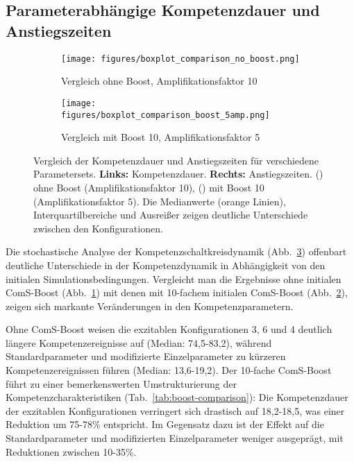\documentclass[11pt]{article}
\begin{document}
\subsection{Parameterabhängige Kompetenzdauer und Anstiegszeiten}

\begin{figure}
    \centering
    \begin{subfigure}{\textwidth}
        \centering
        \texttt{[image: figures/boxplot\_comparison\_no\_boost.png]}
        \caption{Vergleich ohne Boost, Amplifikationsfaktor 10}
        \label{fig:boxplot_no_boost}
    \end{subfigure}
    
    \vspace{0.3cm} %
    
    \begin{subfigure}{\textwidth}
        \centering
        \texttt{[image: figures/boxplot\_comparison\_boost\_5amp.png]}
        \caption{Vergleich mit Boost 10, Amplifikationsfaktor 5}
        \label{fig:boxplot_with_boost}
    \end{subfigure}
    
    \caption{Vergleich der Kompetenzdauer und Anstiegszeiten für verschiedene Parametersets. \textbf{Links:} Kompetenzdauer. \textbf{Rechts:} Anstiegszeiten. () ohne Boost (Amplifikationsfaktor 10), () mit Boost 10 (Amplifikationsfaktor 5). Die Medianwerte (orange Linien), Interquartilbereiche und Ausreißer zeigen deutliche Unterschiede zwischen den Konfigurationen.}
    \label{fig:boxplot_comparison}
\end{figure}

Die stochastische Analyse der Kompetenzschaltkreisdynamik (Abb.~\ref{fig:boxplot_comparison}) offenbart deutliche Unterschiede in der Kompetenzdynamik in Abhängigkeit von den initialen Simulationsbedingungen. Vergleicht man die Ergebnisse ohne initialen ComS-Boost (Abb.~\ref{fig:boxplot_no_boost}) mit denen mit 10-fachem initialen ComS-Boost (Abb.~\ref{fig:boxplot_with_boost}), zeigen sich markante Veränderungen in den Kompetenzparametern.

Ohne ComS-Boost weisen die exzitablen Konfigurationen 3, 6 und 4 deutlich längere Kompetenzereignisse auf (Median: 74,5-83,2), während Standardparameter und modifizierte Einzelparameter zu kürzeren Kompetenzereignissen führen (Median: 13,6-19,2). Der 10-fache ComS-Boost führt zu einer bemerkenswerten Umstrukturierung der Kompetenzcharakteristiken (Tab.~\ref{tab:boost-comparison}): Die Kompetenzdauer der exzitablen Konfigurationen verringert sich drastisch auf 18,2-18,5, was einer Reduktion um 75-78\% entspricht. Im Gegensatz dazu ist der Effekt auf die Standardparameter und modifizierten Einzelparameter weniger ausgeprägt, mit Reduktionen zwischen 10-35\%.
\end{document}
